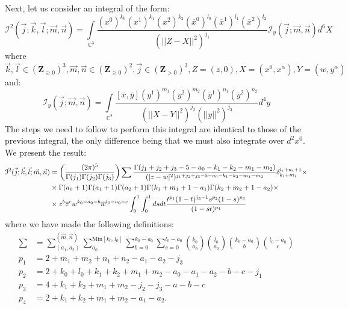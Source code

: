 \documentclass[a4paper,11pt]{article}
\begin{document}
Next, let us consider an integral of the form:
\begin{equation}
    \mathcal{I}^2(\vec{j};\vec{k},\vec{l};\vec{m}, \vec{n}) = \underset{\mathbb{C}^3}{\int} \frac{ (x^0)^{k_0} (x^1)^{k_1} (x^2)^{k_2} (\overline{x}^0)^{l_0} (\overline{x}^1)^{l_1} (\overline{x}^2)^{l_2}}{(\vert \vert Z-X \vert \vert^2)^{j_1}} \mathcal{I}_y (\vec{j};\vec{m}, \vec{n}) d^6X \label{eq:main type 2}
\end{equation}
where $\vec{k},\vec{l} \in (\mathbf{Z}_{\geq 0})^3, \vec{m},\vec{n} \in (\mathbf{Z}_{\geq 0})^2, \vec{j} \in (\mathbf{Z}_{>0})^3, Z = (z,0), X = (x^0,x^{\dot{\alpha}}), Y = (w,y^{\dot{\alpha}})$ and:  
\begin{equation}
    \mathcal{I}_y (\vec{j};\vec{m}, \vec{n}) = \underset{\mathbb{C}^2}{\int} \frac{[\overline{x},\overline{y}] (y^1)^{m_1} (y^2)^{m_2} (\overline{y}^1)^{n_1} (\overline{y}^2)^{n_2}}{(\vert \vert X-Y \vert \vert^2)^{j_2} (\vert \vert y \vert \vert^2)^{j_3}} d^4y
\end{equation}
The steps we need to follow to perform this integral are identical to those of the previous integral, the only difference being that we must also integrate over $d^2x^0$. We present the result: 
\begingroup \allowdisplaybreaks \begin{align}
\mathcal{I}^2(\vec{j};\vec{k},\vec{l};\vec{m}, \vec{n}) &= \bigg(\frac{(2\pi)^5}{\Gamma(j_1) \Gamma(j_2) \Gamma(j_3)}\bigg) \sum \frac{\Gamma(j_1+j_2+j_3-5-a_0-k_1-k_2-m_1-m_2)}{(\vert z-w \vert^2)^{j_1+j_2+j_3-5-a_0-k_1-k_2-m_1-m_2}} \delta_{k_i+m_i}^{l_i+n_i+1} \times \notag \\
&\times  \Gamma(a_0+1) \Gamma(a_1+1) \Gamma(a_2+1) \Gamma(k_1+m_1+1-a_1) \Gamma(k_2+m_2+1-a_2) \times \notag \\
&\times z^b \overline{z}^c w^{k_0-a_0-b} \overline{w}^{l_0-a_0-c} \int_0^1 \int_0^1 ds dt \frac{t^{p_1} (1-t)^{j_3-1} s^{p_2} (1-s)^{p_3}}{(1-st)^{p_4}}
\end{align} \endgroup
where we have made the following definitions:
\begingroup \allowdisplaybreaks \begin{align}
\sum & = \sum_{(a_1,a_2)}^{(\vec{m},\vec{n})} \sum_{a_0}^{\text{Min}[k_0,l_0]} \sum_{b=0}^{k_0-a_0} \sum_{c=0}^{l_0-a_0} {k_0 \choose a_0} {l_0 \choose a_0} {k_0-a_0 \choose b} {l_0-a_0 \choose c} \\
    p_1 &= 2+m_1+m_2+n_1+n_2-a_1-a_2-j_3 \\ p_2 &= 2+k_0+l_0+k_1+k_2+m_1+m_2-a_0-a_1-a_2-b-c-j_1 \\  p_3 &= 4+k_1+k_2+m_1+m_2-j_2-j_3-a-b-c \\ p_4 &= 2+k_1+k_2+m_1+m_2-a_1-a_2.
\end{align} \endgroup
\end{document}
